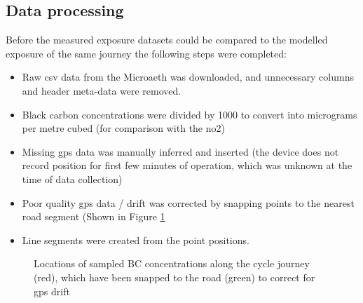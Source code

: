 \subsection{Data processing}
\label{subsec:dataprocessing}

Before the measured exposure datasets could be compared to the modelled exposure of the same journey the following steps were completed:

\begin{itemize}
    \item Raw \gls{csv} data from the Microaeth was downloaded, and unnecessary columns and header meta-data were removed.
    \item Black carbon concentrations were divided by 1000 to convert into micrograms per metre cubed (for comparison with the \gls{no2})
    \item Missing \gls{gps} data was manually inferred and inserted (the device does not record position for first few minutes of operation, which was unknown at the time of data collection)
    \item Poor quality \gls{gps} data / drift was corrected by snapping points to the nearest road segment (Shown in Figure \ref{fig:snapping_cycle_to_road}
    \item Line segments were created from the point positions.
\end{itemize}

\begin{figure}[H]
\centering
{}
\caption{Locations of sampled BC concentrations along the cycle journey (red), which have been snapped to the road (green) to correct for \gls{gps} drift}
\label{fig:snapping_cycle_to_road}
\end{figure}

